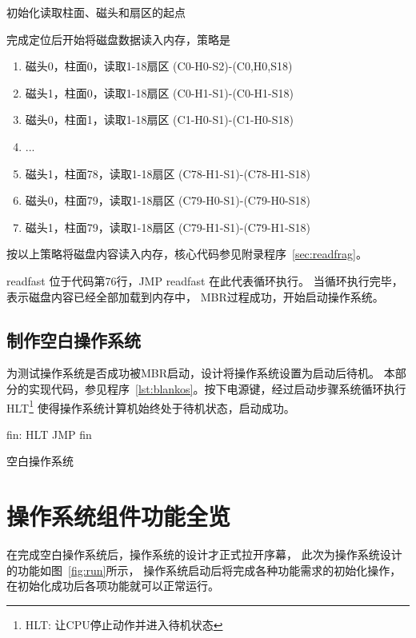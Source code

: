 \begin{listing}[H]
  \begin{codeblock}[.5]
  \inputminted[tabsize=2, firstline=43, lastline=45,
  linenos=true]{nasm}{../ZOS/src/kernel/ipl09.nas}
  \end{codeblock}
  \caption{初始化读取柱面、磁头和扇区的起点}
  \label{lst:chs}
\end{listing}

完成定位后开始将磁盘数据读入内存，策略是
\begin{enumerate}
\item 磁头0，柱面0，读取1-18扇区 (C0-H0-S2)-(C0,H0,S18)
\item 磁头1，柱面0，读取1-18扇区 (C0-H1-S1)-(C0-H1-S18)
\item 磁头0，柱面1，读取1-18扇区 (C1-H0-S1)-(C1-H0-S18)
\item ...
\item 磁头1，柱面78，读取1-18扇区 (C78-H1-S1)-(C78-H1-S18)
\item 磁头0，柱面79，读取1-18扇区 (C79-H0-S1)-(C79-H0-S18)
\item 磁头1，柱面79，读取1-18扇区 (C79-H1-S1)-(C79-H1-S18)
\end{enumerate}

按以上策略将磁盘内容读入内存，核心代码参见附录程序~\ref{sec:readfrag}。

readfast 位于代码第76行，JMP readfast 在此代表循环执行。
当循环执行完毕，表示磁盘内容已经全部加载到内存中，
MBR过程成功，开始启动操作系统。

\subsection{制作空白操作系统}

为测试操作系统是否成功被MBR启动，设计将操作系统设置为启动后待机。
本部分的实现代码，参见程序~\ref{lst:blankos}。按下电源键，经过启动步骤系统循环执行
HLT\footnote{HLT: 让CPU停止动作并进入待机状态\cite{30_osKawaiHidemi200630}}
使得操作系统计算机始终处于待机状态，启动成功。

\begin{listing}[H]
  \begin{codeblock}[.5]
    \begin{nasmcode}
      fin:
      HLT
      JMP fin
    \end{nasmcode}
  \end{codeblock}
  \caption{空白操作系统}
  \label{lst:blankos}
\end{listing}

\section{操作系统组件功能全览}
在完成空白操作系统后，操作系统的设计才正式拉开序幕，
此次为操作系统设计的功能如图~\ref{fig:run}所示，
操作系统启动后将完成各种功能需求的初始化操作，
在初始化成功后各项功能就可以正常运行。

